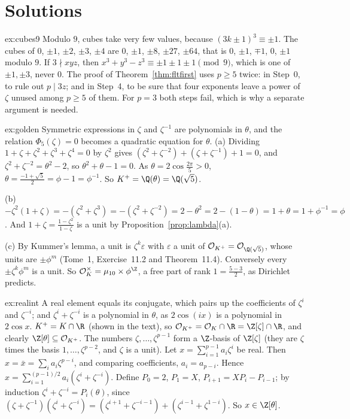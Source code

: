 \section{Solutions}

\begin{solution}{ex:cubes9}
\idea Modulo $9$, cubes take very few values, because $(3k\pm1)^3\equiv\pm1$.
\writeup The cubes of $0$, $\pm1$, $\pm2$, $\pm3$, $\pm4$ are $0$, $\pm1$, $\pm8$, $\pm27$, $\pm64$, that is $0$, $\pm1$, $\mp1$, $0$,
$\pm1$ modulo $9$. If $3\nmid
xyz$, then $x^3+y^3-z^3\equiv\pm1\pm1\pm1\pmod9$, which is one of $\pm1,\pm3$, never $0$. The proof of
Theorem~\ref{thm:fltfirst} uses $p\ge5$ twice: in Step~0, to rule out $p\mid3z$; and in Step~4, to be sure that four exponents
leave a power of $\zeta$ unused among $p\ge5$ of them. For $p=3$ both steps fail, which is why a separate argument is needed.
\end{solution}

\begin{solution}{ex:golden}
\idea Symmetric expressions in $\zeta$ and $\zeta^{-1}$ are polynomials in $\theta$, and the relation $\Phi_5(\zeta)=0$ becomes a
quadratic equation for $\theta$.
\writeup (a) Dividing $1+\zeta+\zeta^2+\zeta^3+\zeta^4=0$ by $\zeta^2$ gives $(\zeta^2+\zeta^{-2})+(\zeta+\zeta^{-1})+1=0$, and
$\zeta^2+\zeta^{-2}=\theta^2-2$, so $\theta^2+\theta-1=0$. As $\theta=2\cos\frac{2\pi}5>0$, $\theta=\frac{-1+\sqrt5}2=\phi-1=
\phi^{-1}$. So $K^+=\Q(\theta)=\Q(\sqrt5)$.

(b) $-\zeta^2(1+\zeta)=-(\zeta^2+\zeta^3)=-(\zeta^2+\zeta^{-2})=2-\theta^2=2-(1-\theta)=1+\theta=1+\phi^{-1}=\phi$. And
$1+\zeta=\frac{1-\zeta^2}{1-\zeta}$ is a unit by Proposition~\ref{prop:lambda}(a).

(c) By Kummer's lemma, a unit is $\zeta^k\varepsilon$ with $\varepsilon$ a unit of $\mathcal O_{K^+}=\mathcal O_{\Q(\sqrt5)}$,
whose units are $\pm\phi^m$ (Tome~1, Exercise~11.2 and Theorem~11.4). Conversely every $\pm\zeta^k\phi^m$ is a unit. So
$\mathcal O_K^\times=\mu_{10}\times\phi^{\Z}$, a free part of rank $1=\frac{5-3}2$, as Dirichlet predicts.
\end{solution}

\begin{solution}{ex:realint}
\idea A real element equals its conjugate, which pairs up the coefficients of $\zeta^i$ and $\zeta^{-i}$; and
$\zeta^i+\zeta^{-i}$ is a polynomial in $\theta$, as $2\cos(ix)$ is a polynomial in $2\cos x$.
\writeup $K^+=K\cap\R$ (shown in the text), so $\mathcal O_{K^+}=\mathcal O_K\cap\R=\Z[\zeta]\cap\R$, and clearly $\Z[\theta]
\subseteq\mathcal O_{K^+}$. The numbers $\zeta,\dots,\zeta^{p-1}$ form a $\Z$-basis of $\Z[\zeta]$ (they are $\zeta$ times the basis
$1,\dots,\zeta^{p-2}$, and $\zeta$ is a unit). Let $x=\sum_{i=1}^{p-1}a_i\zeta^i$ be real. Then $x=\bar x=\sum_ia_i\zeta^{p-i}$, and
comparing coefficients, $a_i=a_{p-i}$. Hence $x=\sum_{i=1}^{(p-1)/2}a_i(\zeta^i+\zeta^{-i})$. Define $P_0=2$, $P_1=X$,
$P_{i+1}=XP_i-P_{i-1}$; by induction $\zeta^i+\zeta^{-i}=P_i(\theta)$, since $(\zeta+\zeta^{-1})(\zeta^i+\zeta^{-i})=(\zeta^{i+1}+
\zeta^{-i-1})+(\zeta^{i-1}+\zeta^{1-i})$. So $x\in\Z[\theta]$.
\end{solution}

